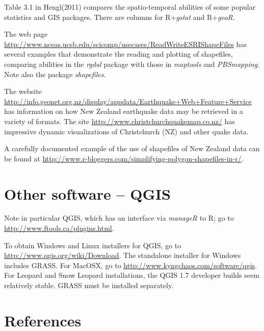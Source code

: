 {Table 3.1 in Hengl(2011) compares the
  spatio-temporal abilities of some popular statistics and GIS
  packages.  There are columns for R+{\em gstat} and R+{\em geoR.}

The web page
\url{http://www.nceas.ucsb.edu/scicomp/usecases/ReadWriteESRIShapeFiles}
has several examples that demonstrate the reading and plotting of
shapefiles, comparing abilities in the {\em rgdal} package with those
in {\em maptools} and {\em PBSmapping}. Note also the package
{\em shapefiles}.

The website
\url{http://info.geonet.org.nz/display/appdata/Earthquake+Web+Feature+Service}
has information on how New Zealand earthquake data may be retrieved in
a variety of formats.
The site \url{http://www.christchurchquakemap.co.nz/} has impressive
dynamic visualizations of Christchurch (NZ) and other quake data.

A carefully documented example of the use of shapefiles of New Zealand
data can be found at\newline
\noindent
\url{http://www.r-bloggers.com/simplifying-polygon-shapefiles-in-r/}.
}
\section{Other software -- QGIS}
Note in particular QGIS, which has an interface via {\em manageR} to
R; go to \url{http://www.ftools.ca/plugins.html}.

To obtain Windows and Linux installers for QGIS, go to
\url{http://www.qgis.org/wiki/Download}.  The standalone installer for
Windows includes GRASS.  For MacOSX, go to
\url{http://www.kyngchaos.com/software/qgis}.  For Leopard and Snow Leopard
installations, the QGIS 1.7 developer builds seem relatively stable.
GRASS must be installed separately.

\section{References}

